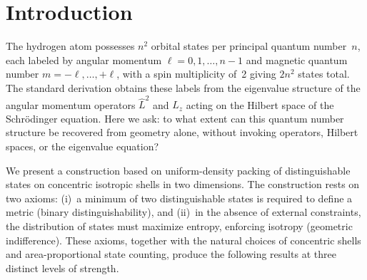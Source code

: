 \documentclass[aps,prl,reprint,amsmath,amssymb]{revtex4-2}
\begin{document}
\begin{abstract}
energy shell $p_0^2 = -2E$ then gives $E_n$ (Paper~7).  \textbf{[OBSERVATION]} This angular cross-section recurs across the
natural geometries of the Geometric Vacuum series as a basis
label:\ the full $(\ell, m)$ labeling, with $2\ell+1$ states per~$\ell$,
labels the basis on $S^3$ for hydrogen, the per-electron partial waves
of the hyperspherical treatment of helium, the angular channels of the
molecule-frame hyperspherical treatment, and each fiber of the composed
bundles ($\ell$ is a \emph{conserved} quantum number only for the
one-electron atom;\ elsewhere it is a channel label coupled by Gaunt
coefficients);\ in the two-centre prolate-spheroidal geometry only $m$
survives as a label, because the $\eta$-separation replaces $\ell$ by a
separation index that reduces to it only in the united-atom limit.  This
is Paper~0 in the series.
\end{abstract}

\maketitle

\section{Introduction}
\label{sec:introduction}

The hydrogen atom possesses $n^2$ orbital states per principal quantum
number~$n$, each labeled by angular momentum
$\ell = 0, 1, \ldots, n-1$ and magnetic quantum number
$m = -\ell, \ldots, +\ell$, with a spin multiplicity of~2 giving
$2n^2$ states total.  The standard derivation obtains these labels
from the eigenvalue structure of the angular momentum operators
$\hat{L}^2$ and $\hat{L}_z$ acting on the Hilbert space of the
Schr\"odinger equation.  Here we ask: to what extent can this quantum
number structure be recovered from geometry alone, without invoking
operators, Hilbert spaces, or the eigenvalue equation?

We present a construction based on uniform-density packing of
distinguishable states on concentric isotropic shells in two
dimensions.  The construction rests on two axioms:
(i)~a minimum of two distinguishable states is required to define a
metric (binary distinguishability), and (ii)~in the absence of
external constraints, the distribution of states must maximize
entropy, enforcing isotropy (geometric indifference).  These axioms,
together with the natural choices of concentric shells and
area-proportional state counting, produce the following results at
three distinct levels of strength.
\end{document}
